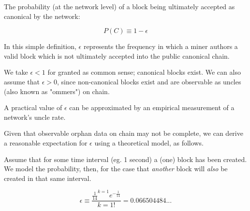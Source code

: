 \documentclass[11pt]{article}
\theoremstyle{plain}
\newcommand{\comment}[1]{}
\begin{document}
{The probability (at the network level) of a block being ultimately accepted as
canonical by the network:

\begin{equation}
P(C) \equiv 1 - \epsilon
\end{equation}

In this simple definition, $\epsilon$ represents the frequency in which a miner
authors a valid block which is not ultimately accepted into the public canonical chain.

We take $\epsilon < 1$ for granted as common sense; canonical blocks exist.
We can also assume that $\epsilon > 0$, since non-canonical blocks exist and
are observable as uncles (also known as "ommers") on chain.

A practical value of $\epsilon$ can be approximated by an empirical measurement
of a network's uncle rate.\nolinebreak
\comment{
\footnote{
  There is a lot to say about this, and the nuances of this idea are important
for understanding what kind of approximation this is, and what its limits are.
  A few brief statements are provided for context below, but should not be
considered comprehensive or definitive:

  The Uncle rate represents a record of the existence of blocks which are not
canonical.
  Iff the revenue for those non-canonical blocks is less than their cost of
production, the existence of any non-canonical blocks implies waste, which
suggests a production inefficiency and an economically undesirable
characteristic.
  From this, understanding that the uncle records provided on chain are
potentially incomplete records of the existence of non-canonical blocks.

  We might explore this further by look at the rewards more closely.

  Is it actually reasonable for a miner to record an uncle, getting the
  other miner paid? Or are uncles only recorded when the author of the
  canonical block is also the author of the uncle?
}}
Given that observable orphan data on chain may not be complete,
we can derive a reasonable expectation for $\epsilon$ using a
theoretical model, as follows.

Assume that for some time interval (eg. 1 second) a (one) block has been created.
We model the probability, then, for the case that \emph{another} block
will \emph{also} be created in that same interval.

\begin{equation}
    \epsilon \equiv \frac{\frac{1}{14}^{k=1}e^{-\frac{1}{14}}}{k=1!} = 0.066504484...
\end{equation}

}
\end{document}
